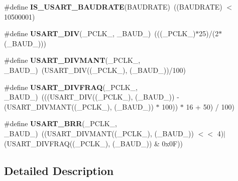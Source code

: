 \begin{DoxyCompactItemize}
\item 
\#define {\bfseries I\+S\+\_\+\+U\+S\+A\+R\+T\+\_\+\+B\+A\+U\+D\+R\+A\+TE}(B\+A\+U\+D\+R\+A\+TE)~((B\+A\+U\+D\+R\+A\+TE) $<$ 10500001)\hypertarget{group___u_s_a_r_t___private___macros_ga9dc365e0a1e01031a8e0757a34b9d420}{}\label{group___u_s_a_r_t___private___macros_ga9dc365e0a1e01031a8e0757a34b9d420}

\item 
\#define {\bfseries U\+S\+A\+R\+T\+\_\+\+D\+IV}(\+\_\+\+P\+C\+L\+K\+\_\+,  \+\_\+\+B\+A\+U\+D\+\_\+)~(((\+\_\+\+P\+C\+L\+K\+\_\+)$\ast$25)/(2$\ast$(\+\_\+\+B\+A\+U\+D\+\_\+)))\hypertarget{group___u_s_a_r_t___private___macros_ga97e94c06b8493c8eafac36cb787dcb26}{}\label{group___u_s_a_r_t___private___macros_ga97e94c06b8493c8eafac36cb787dcb26}

\item 
\#define {\bfseries U\+S\+A\+R\+T\+\_\+\+D\+I\+V\+M\+A\+NT}(\+\_\+\+P\+C\+L\+K\+\_\+,  \+\_\+\+B\+A\+U\+D\+\_\+)~(U\+S\+A\+R\+T\+\_\+\+D\+IV((\+\_\+\+P\+C\+L\+K\+\_\+), (\+\_\+\+B\+A\+U\+D\+\_\+))/100)\hypertarget{group___u_s_a_r_t___private___macros_gaa2c98efc6728b5c725cb8d0105e877a5}{}\label{group___u_s_a_r_t___private___macros_gaa2c98efc6728b5c725cb8d0105e877a5}

\item 
\#define {\bfseries U\+S\+A\+R\+T\+\_\+\+D\+I\+V\+F\+R\+AQ}(\+\_\+\+P\+C\+L\+K\+\_\+,  \+\_\+\+B\+A\+U\+D\+\_\+)~(((U\+S\+A\+R\+T\+\_\+\+D\+IV((\+\_\+\+P\+C\+L\+K\+\_\+), (\+\_\+\+B\+A\+U\+D\+\_\+)) -\/ (U\+S\+A\+R\+T\+\_\+\+D\+I\+V\+M\+A\+NT((\+\_\+\+P\+C\+L\+K\+\_\+), (\+\_\+\+B\+A\+U\+D\+\_\+)) $\ast$ 100)) $\ast$ 16 + 50) / 100)\hypertarget{group___u_s_a_r_t___private___macros_ga00df975ff1f97cde5c9aff11decf858b}{}\label{group___u_s_a_r_t___private___macros_ga00df975ff1f97cde5c9aff11decf858b}

\item 
\#define {\bfseries U\+S\+A\+R\+T\+\_\+\+B\+RR}(\+\_\+\+P\+C\+L\+K\+\_\+,  \+\_\+\+B\+A\+U\+D\+\_\+)~((U\+S\+A\+R\+T\+\_\+\+D\+I\+V\+M\+A\+NT((\+\_\+\+P\+C\+L\+K\+\_\+), (\+\_\+\+B\+A\+U\+D\+\_\+)) $<$$<$ 4)$\vert$(U\+S\+A\+R\+T\+\_\+\+D\+I\+V\+F\+R\+AQ((\+\_\+\+P\+C\+L\+K\+\_\+), (\+\_\+\+B\+A\+U\+D\+\_\+)) \& 0x0\+F))\hypertarget{group___u_s_a_r_t___private___macros_ga783dc52032f468497a8affe268751909}{}\label{group___u_s_a_r_t___private___macros_ga783dc52032f468497a8affe268751909}

\end{DoxyCompactItemize}


\subsection{Detailed Description}


